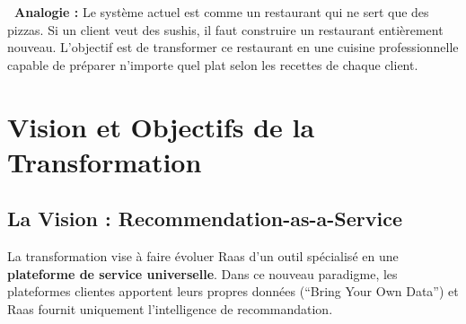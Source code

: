 \documentclass[11pt,a4paper]{report}
\newcommand{\concept}[1]{\textcolor{raasPrimary}{\textbf{#1}}}
\begin{document}
\begin{alertbox}
\textbf{\faLightbulb\ Analogie :} Le système actuel est comme un restaurant qui ne sert que des pizzas. Si un client veut des sushis, il faut construire un restaurant entièrement nouveau. L'objectif est de transformer ce restaurant en une cuisine professionnelle capable de préparer n'importe quel plat selon les recettes de chaque client.
\end{alertbox}


\chapter{Vision et Objectifs de la Transformation}

\section{La Vision : Recommendation-as-a-Service}

La transformation vise à faire évoluer Raas d'un outil spécialisé en une \concept{plateforme de service universelle}. Dans ce nouveau paradigme, les plateformes clientes apportent leurs propres données (``Bring Your Own Data'') et Raas fournit uniquement l'intelligence de recommandation.
\end{document}
